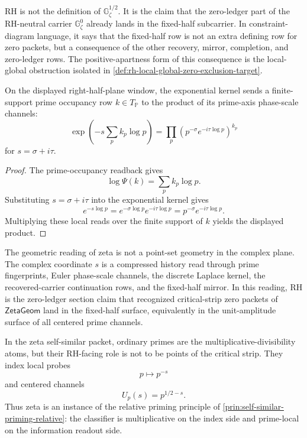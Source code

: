\begin{principle}
\label{prin:rh-endogenous-fixed-half-constraint}
RH is not the definition of $\mathbb G_{\zeta}^{1/2}$. It is the claim
that the zero-ledger part of the RH-neutral carrier
$\mathbb G_{\zeta}^{0}$ already lands in the fixed-half subcarrier. In
constraint-diagram language, it says that the fixed-half row is not an
extra defining row for zero packets, but a consequence of the other
recovery, mirror, completion, and zero-ledger rows. The positive-apartness
form of this consequence is the local-global obstruction isolated in
\autoref{def:rh-local-global-zero-exclusion-target}.
\end{principle}

\begin{proposition}
\label{prop:rh-euler-phase-channels-prime-axis-readouts}
On the displayed right-half-plane window, the exponential kernel sends a
finite-support prime occupancy row $k\in T_{\mathbb P}$ to the product of
its prime-axis phase-scale channels:
$$
\exp\left(-s\sum_{p}k_p\log p\right)
=
\prod_p\left(p^{-\sigma}e^{-i\tau\log p}\right)^{k_p}
$$
for $s=\sigma+i\tau$.
\end{proposition}

\begin{proof}
The prime-occupancy readback gives
$$
\log\Psi(k)=\sum_p k_p\log p.
$$
Substituting $s=\sigma+i\tau$ into the exponential kernel gives
$$
e^{-s\log p}=e^{-\sigma\log p}e^{-i\tau\log p}=p^{-\sigma}e^{-i\tau\log p}.
$$
Multiplying these local reads over the finite support of $k$ yields the
displayed product.
\end{proof}

\begin{principle}
\label{prin:rh-zeta-geometry-recovered-carrier-geometry}
The geometric reading of zeta is not a point-set geometry in the complex
plane. The complex coordinate $s$ is a compressed history read through
prime fingerprints, Euler phase-scale channels, the discrete Laplace
kernel, the recovered-carrier continuation rows, and the fixed-half
mirror. In this reading, RH is the zero-ledger section claim that
recognized critical-strip zero packets of $\mathsf{ZetaGeom}$ land in the
fixed-half surface, equivalently in the unit-amplitude surface of all
centered prime channels.
\end{principle}

\begin{principle}
\label{prin:rh-prime-rows-local-probes-recovered-carrier}
In the zeta self-similar packet, ordinary primes are the
multiplicative-divisibility atoms, but their RH-facing role is not to be
points of the critical strip. They index local probes
$$
p\mapsto p^{-s}
$$
and centered channels
$$
U_p(s)=p^{1/2-s}.
$$
Thus zeta is an instance of the relative priming principle of
\autoref{prin:self-similar-priming-relative}: the classifier is
multiplicative on the index side and prime-local on the information
readout side.
\end{principle}

